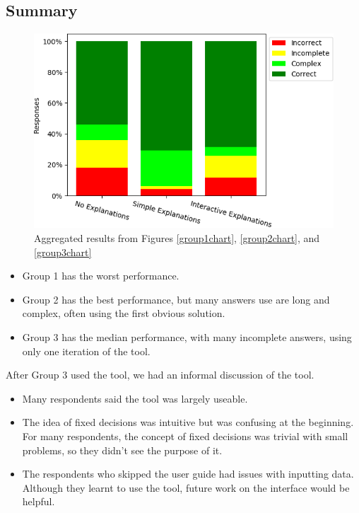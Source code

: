 \subsection{Summary}

\begin{figure}
	\begin{center}
		\includegraphics[scale=0.55]{figures/questionnaire_results_summary}
	\end{center}
	\caption{Aggregated results from Figures \ref{group1chart}, \ref{group2chart}, and \ref{group3chart}}
	\label{summarychart}
\end{figure}

\begin{itemize}
	\item Group 1 has the worst performance.
	\item Group 2 has the best performance, but many answers use are long and complex, often using the first obvious solution.
	\item Group 3 has the median performance, with many incomplete answers, using only one iteration of the tool.
\end{itemize}

After Group 3 used the tool, we had an informal discussion of the tool.
\begin{itemize}
	\item Many respondents said the tool was largely useable. 
	\item The idea of fixed decisions was intuitive but was confusing at the beginning. For many respondents, the concept of fixed decisions was trivial with small problems, so they didn't see the purpose of it.
	\item The respondents who skipped the user guide had issues with inputting data. Although they learnt to use the tool, future work on the interface would be helpful. 
\end{itemize}

